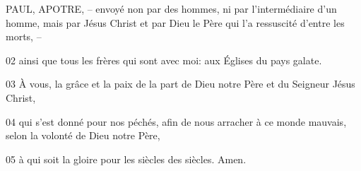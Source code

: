 PAUL, APOTRE, – envoyé non par des hommes, ni par l’intermédiaire d’un homme, mais par Jésus Christ et par Dieu le Père qui l’a ressuscité d’entre les morts, –

02 ainsi que tous les frères qui sont avec moi: aux Églises du pays galate.

03 À vous, la grâce et la paix de la part de Dieu notre Père et du Seigneur Jésus Christ,

04 qui s’est donné pour nos péchés, afin de nous arracher à ce monde mauvais, selon la volonté de Dieu notre Père,

05 à qui soit la gloire pour les siècles des siècles. Amen.
